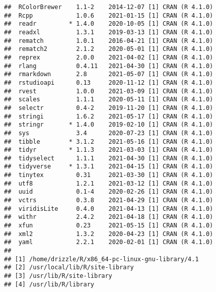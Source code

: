 \documentclass[]{ctexart}
\begin{document}
\begin{verbatim}
##  RColorBrewer    1.1-2    2014-12-07 [1] CRAN (R 4.1.0)
##  Rcpp            1.0.6    2021-01-15 [1] CRAN (R 4.1.0)
##  readr         * 1.4.0    2020-10-05 [1] CRAN (R 4.1.0)
##  readxl          1.3.1    2019-03-13 [1] CRAN (R 4.1.0)
##  rematch         1.0.1    2016-04-21 [1] CRAN (R 4.1.0)
##  rematch2        2.1.2    2020-05-01 [1] CRAN (R 4.1.0)
##  reprex          2.0.0    2021-04-02 [1] CRAN (R 4.1.0)
##  rlang           0.4.11   2021-04-30 [1] CRAN (R 4.1.0)
##  rmarkdown       2.8      2021-05-07 [1] CRAN (R 4.1.0)
##  rstudioapi      0.13     2020-11-12 [1] CRAN (R 4.1.0)
##  rvest           1.0.0    2021-03-09 [1] CRAN (R 4.1.0)
##  scales          1.1.1    2020-05-11 [1] CRAN (R 4.1.0)
##  selectr         0.4-2    2019-11-20 [1] CRAN (R 4.1.0)
##  stringi         1.6.2    2021-05-17 [1] CRAN (R 4.1.0)
##  stringr       * 1.4.0    2019-02-10 [1] CRAN (R 4.1.0)
##  sys             3.4      2020-07-23 [1] CRAN (R 4.1.0)
##  tibble        * 3.1.2    2021-05-16 [1] CRAN (R 4.1.0)
##  tidyr         * 1.1.3    2021-03-03 [1] CRAN (R 4.1.0)
##  tidyselect      1.1.1    2021-04-30 [1] CRAN (R 4.1.0)
##  tidyverse     * 1.3.1    2021-04-15 [1] CRAN (R 4.1.0)
##  tinytex         0.31     2021-03-30 [1] CRAN (R 4.1.0)
##  utf8            1.2.1    2021-03-12 [1] CRAN (R 4.1.0)
##  uuid            0.1-4    2020-02-26 [1] CRAN (R 4.1.0)
##  vctrs           0.3.8    2021-04-29 [1] CRAN (R 4.1.0)
##  viridisLite     0.4.0    2021-04-13 [1] CRAN (R 4.1.0)
##  withr           2.4.2    2021-04-18 [1] CRAN (R 4.1.0)
##  xfun            0.23     2021-05-15 [1] CRAN (R 4.1.0)
##  xml2            1.3.2    2020-04-23 [1] CRAN (R 4.1.0)
##  yaml            2.2.1    2020-02-01 [1] CRAN (R 4.1.0)
## 
## [1] /home/drizzle/R/x86_64-pc-linux-gnu-library/4.1
## [2] /usr/local/lib/R/site-library
## [3] /usr/lib/R/site-library
## [4] /usr/lib/R/library
\end{verbatim}
\end{document}
